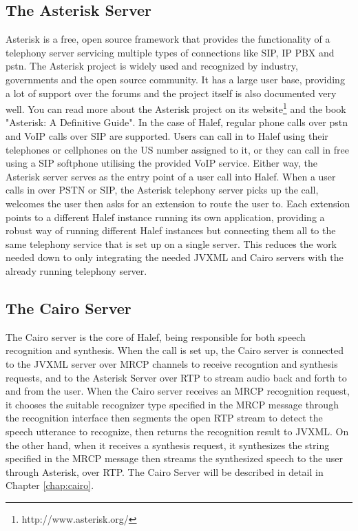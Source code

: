 \subsection{The Asterisk Server}
Asterisk is a free, open source framework that provides the functionality of a telephony server servicing multiple types of connections like SIP, IP PBX and \ac{pstn}.
The Asterisk project is widely used and recognized by industry, governments and the open source community.
It has a large user base, providing a lot of support over the forums and the project itself is also documented very well.
You can read more about the Asterisk project on its website\footnote{http://www.asterisk.org/} and the book "Asterisk: A Definitive Guide"\cite{asterisk}.
In the case of Halef, regular phone calls over \ac{pstn} and VoIP calls over SIP are supported.
Users can call in to Halef using their telephones or cellphones on the US number assigned to it, or they can call in free using a SIP softphone utilising the provided VoIP service.
Either way, the Asterisk server serves as the entry point of a user call into Halef.
When a user calls in over PSTN or SIP, the Asterisk telephony server picks up the call, welcomes the user then asks for an extension to route the user to.
Each extension points to a different Halef instance running its own application, providing a robust way of running different Halef instances but connecting them all to the same telephony service that is set up on a single server.
This reduces the work needed down to only integrating the needed JVXML and Cairo servers with the already running telephony server.

\subsection{The Cairo Server}
The Cairo server is the core of Halef, being responsible for both speech recognition and synthesis.
When the call is set up, the Cairo server is connected to the JVXML server over MRCP channels to receive recogntion and synthesis requests, and to the Asterisk Server over RTP to stream audio back and forth to and from the user.
When the Cairo server receives an MRCP recognition request, it chooses the suitable recognizer type specified in the MRCP message through the recognition interface then segments the open RTP stream to detect the speech utterance to recognize, then returns the recognition result to JVXML.
On the other hand, when it receives a synthesis request, it synthesizes the string specified in the MRCP message then streams the synthesized speech to the user through Asterisk, over RTP.
The Cairo Server will be described in detail in Chapter \ref{chap:cairo}.

